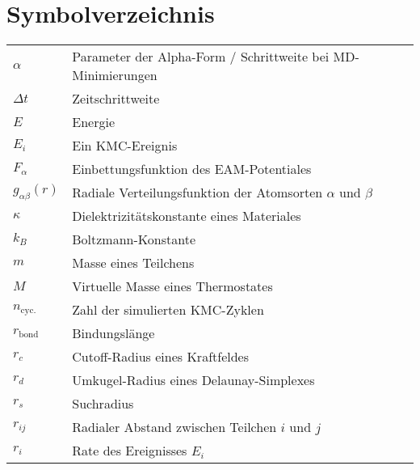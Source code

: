 \chapter*{Symbolverzeichnis}
\def\listacronymname{Symbolverzeichnis}

\begin{tabular}{ll}
$\alpha$             & Parameter der Alpha-Form / Schrittweite bei MD-Minimierungen    \\
$\Delta t$           & Zeitschrittweite                                                \\
$E$                  & Energie                                                         \\
$E_i$                & Ein KMC-Ereignis                                                \\
$F_\alpha$           & Einbettungsfunktion des EAM-Potentiales                         \\
$g_{\alpha\beta}(r)$ & Radiale Verteilungsfunktion der Atomsorten $\alpha$ und $\beta$ \\
$\kappa$             & Dielektrizitätskonstante eines Materiales                       \\
$k_B$                & Boltzmann-Konstante                                             \\
$m$                  & Masse eines Teilchens                                           \\
$M$                  & Virtuelle Masse eines Thermostates                              \\
$n_\text{cyc.}$      & Zahl der simulierten KMC-Zyklen                                 \\
$r_\text{bond}$      & Bindungslänge                                                   \\
$r_c$                & Cutoff-Radius eines Kraftfeldes                                 \\
$r_d$                & Umkugel-Radius eines Delaunay-Simplexes                         \\
$r_s$                & Suchradius                                                      \\
$r_{ij}$             & Radialer Abstand zwischen Teilchen $i$ und $j$                  \\
$r_i$                & Rate des Ereignisses $E_i$                                      \\

\end{tabular}
